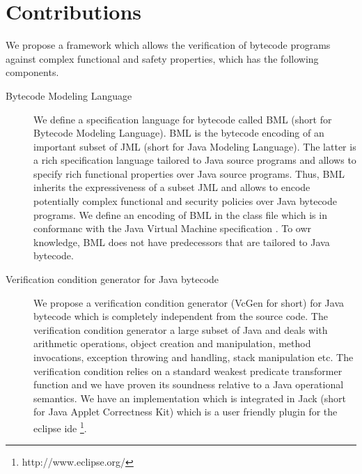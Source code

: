    \section{Contributions}
We propose a framework which allows the verification of bytecode programs against complex functional and safety properties, which has the following 
components.
\begin{description}
     \item [Bytecode Modeling Language] 
         


         We define a   specification language for bytecode called BML (short for Bytecode Modeling Language). 
	 BML is the bytecode encoding of an important subset of JML (short for Java Modeling Language). The latter is a rich specification
	 language tailored to Java source programs and allows to specify rich functional properties over Java source programs.
	 Thus, BML inherits the expressiveness of a subset JML and allows to encode potentially 
	 complex functional and security policies over Java bytecode programs.
	 We define an encoding of BML in the class file which is in conformanc with the Java Virtual Machine specification \cite{VMSpec}.
	 To owr knowledge, BML does not have predecessors that are tailored to Java bytecode.
 
   \item [Verification condition generator for Java bytecode]
	  We propose a verification condition generator (VcGen for short) for Java bytecode which is completely independent from 
	 the source code. The verification condition generator a large subset of Java and deals with
	 arithmetic operations, object creation and manipulation,
	 method invocations, exception throwing and handling, stack manipulation etc.
	 The verification condition relies on a standard weakest predicate transformer function and we
	 have proven its soundness relative to a Java operational semantics.
	 We have an implementation which is integrated in Jack (short for Java Applet Correctness Kit) \cite{BRL-JACK} which is a user friendly 
	 plugin for the eclipse ide \footnote{http://www.eclipse.org/}. 
	 

\end{description}
